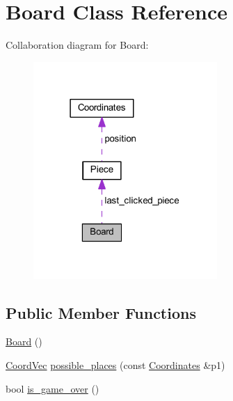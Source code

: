 \hypertarget{class_board}{}\section{Board Class Reference}
\label{class_board}


Collaboration diagram for Board\+:
\nopagebreak
\begin{figure}[H]
\begin{center}
\leavevmode
\includegraphics[width=198pt]{class_board__coll__graph}
\end{center}
\end{figure}
\subsection*{Public Member Functions}
\begin{DoxyCompactItemize}
\item 
\mbox{\hyperlink{class_board_a9ee491d4fea680cf69b033374a9fdfcb}{Board}} ()
\item 
\mbox{\hyperlink{main_8cpp_a267937870648899c879128d3199195ec}{Coord\+Vec}} \mbox{\hyperlink{class_board_a50777989564d829d24dcd8aa63816dcb}{possible\+\_\+places}} (const \mbox{\hyperlink{class_coordinates}{Coordinates}} \&p1)
\item 
bool \mbox{\hyperlink{class_board_a386f2e5861a55976ec6a4e94d4cae38b}{is\+\_\+game\+\_\+over}} ()
\end{DoxyCompactItemize}
